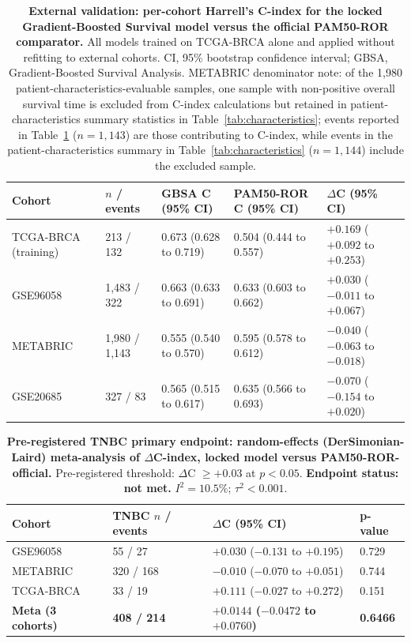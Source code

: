 \documentclass[11pt,letterpaper]{article}
\begin{document}
\begin{table}[H]
\caption{\textbf{External validation: per-cohort Harrell's C-index for the locked Gradient-Boosted Survival model versus the official PAM50-ROR comparator.} All models trained on TCGA-BRCA alone and applied without refitting to external cohorts. CI, 95\% bootstrap confidence interval; GBSA, Gradient-Boosted Survival Analysis. METABRIC denominator note: of the 1,980 patient-characteristics-evaluable samples, one sample with non-positive overall survival time is excluded from C-index calculations but retained in patient-characteristics summary statistics in Table~\ref{tab:characteristics}; events reported in Table~\ref{tab:headtohead} ($n = 1{,}143$) are those contributing to C-index, while events in the patient-characteristics summary in Table~\ref{tab:characteristics} ($n = 1{,}144$) include the excluded sample.}
\label{tab:headtohead}
\small
\setlength{\tabcolsep}{4pt}
\begin{tabularx}{\textwidth}{lXXXX}
\toprule
\textbf{Cohort} & \textbf{$n$ / events} & \textbf{GBSA C (95\% CI)} & \textbf{PAM50-ROR C (95\% CI)} & \textbf{$\Delta$C (95\% CI)} \\
\midrule
TCGA-BRCA (training) & 213 / 132 & 0.673 (0.628 to 0.719) & 0.504 (0.444 to 0.557) & $+0.169$ ($+0.092$ to $+0.253$) \\
GSE96058 & 1,483 / 322 & 0.663 (0.633 to 0.691) & 0.633 (0.603 to 0.662) & $+0.030$ ($-0.011$ to $+0.067$) \\
METABRIC & 1,980 / 1,143 & 0.555 (0.540 to 0.570) & 0.595 (0.578 to 0.612) & $-0.040$ ($-0.063$ to $-0.018$) \\
GSE20685 & 327 / 83 & 0.565 (0.515 to 0.617) & 0.635 (0.566 to 0.693) & $-0.070$ ($-0.154$ to $+0.020$) \\
\bottomrule
\end{tabularx}
\end{table}

\begin{table}[H]
\caption{\textbf{Pre-registered TNBC primary endpoint: random-effects (DerSimonian-Laird) meta-analysis of $\Delta$C-index, locked model versus PAM50-ROR-official.} Pre-registered threshold: $\Delta$C $\geq +0.03$ at $p < 0.05$. \textbf{Endpoint status: not met.} $I^2 = 10.5\%$; $\tau^2 < 0.001$.}
\label{tab:tnbc}
\small
\begin{tabularx}{\textwidth}{lXXX}
\toprule
\textbf{Cohort} & \textbf{TNBC $n$ / events} & \textbf{$\Delta$C (95\% CI)} & \textbf{p-value} \\
\midrule
GSE96058 & 55 / 27 & $+0.030$ ($-0.131$ to $+0.195$) & 0.729 \\
METABRIC & 320 / 168 & $-0.010$ ($-0.070$ to $+0.051$) & 0.744 \\
TCGA-BRCA & 33 / 19 & $+0.111$ ($-0.027$ to $+0.272$) & 0.151 \\
\textbf{Meta (3 cohorts)} & \textbf{408 / 214} & \textbf{$+0.0144$ ($-0.0472$ to $+0.0760$)} & \textbf{0.6466} \\
\bottomrule
\end{tabularx}
\end{table}
\end{document}
